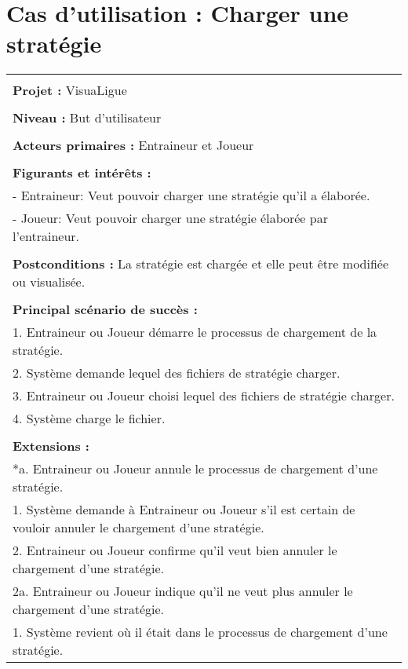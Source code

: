 \section{Cas d'utilisation : Charger une stratégie}
\begin{longtable}{|p{16cm}|}
	\hline
	\\
	\textbf{Projet :} VisuaLigue\\
	\\
	\textbf{Niveau :} But d'utilisateur\\
	\\
	\textbf{Acteurs primaires :} Entraineur et Joueur\\
	\\
	\textbf{Figurants et intérêts :} \\
	- Entraineur: Veut pouvoir charger une stratégie qu'il a élaborée.\\
	- Joueur: Veut pouvoir charger une stratégie élaborée par l'entraineur.\\
	\\
	\textbf{Postconditions :} La stratégie est chargée et elle peut être modifiée ou visualisée.\\
	\\
	\textbf{Principal scénario de succès :}\\
	1. Entraineur ou Joueur démarre le processus de chargement de la stratégie.\\
	2. Système demande lequel des fichiers de stratégie charger.\\
	3. Entraineur ou Joueur choisi lequel des fichiers de stratégie charger.\\
	4. Système charge le fichier.\\
	\\
	\textbf{Extensions :}\\
	*a. Entraineur ou Joueur annule le processus de chargement d'une stratégie.\\
	\hspace{1cm}1. Système demande à Entraineur ou Joueur s'il est certain de vouloir annuler le chargement d'une stratégie.\\
	\hspace{1cm}2. Entraineur ou Joueur confirme qu'il veut bien annuler le chargement d'une stratégie.\\
	\hspace{2cm}2a. Entraineur ou Joueur indique qu'il ne veut plus annuler le chargement d'une stratégie.\\
	\hspace{3cm}1. Système revient où il était dans le processus de chargement d'une stratégie.\\

\end{longtable}
